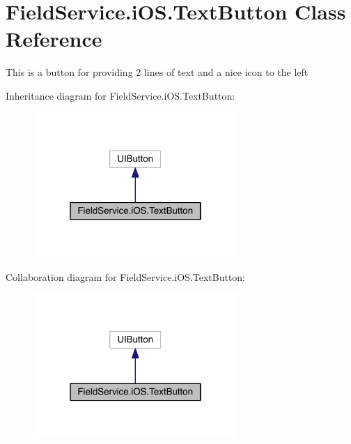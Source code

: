 \hypertarget{class_field_service_1_1i_o_s_1_1_text_button}{\section{Field\+Service.\+i\+O\+S.\+Text\+Button Class Reference}
\label{class_field_service_1_1i_o_s_1_1_text_button}
}


This is a button for providing 2 lines of text and a nice icon to the left  




Inheritance diagram for Field\+Service.\+i\+O\+S.\+Text\+Button\+:
\nopagebreak
\begin{figure}[H]
\begin{center}
\leavevmode
\includegraphics[width=220pt]{class_field_service_1_1i_o_s_1_1_text_button__inherit__graph}
\end{center}
\end{figure}


Collaboration diagram for Field\+Service.\+i\+O\+S.\+Text\+Button\+:
\nopagebreak
\begin{figure}[H]
\begin{center}
\leavevmode
\includegraphics[width=220pt]{class_field_service_1_1i_o_s_1_1_text_button__coll__graph}
\end{center}
\end{figure}
